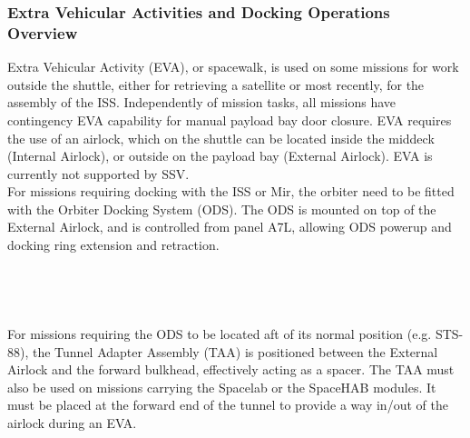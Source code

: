 \documentclass[Space_Shuttle_Vessel_Manual.tex]{subfiles}
\begin{document}
\begin{multicols*}{2}
\subsubsection{Extra Vehicular Activities and Docking Operations Overview}
Extra Vehicular Activity (EVA), or spacewalk, is used on some missions for work outside the shuttle, either for retrieving a satellite or most recently, for the assembly of the ISS. Independently of mission tasks, all missions have contingency EVA capability for manual payload bay door closure. EVA requires the use of an airlock, which on the shuttle can be located inside the middeck (Internal Airlock), or outside on the payload bay (External Airlock). EVA is currently not supported by SSV.\\
For missions requiring docking with the ISS or Mir, the orbiter need to be fitted with the Orbiter Docking System (ODS). The ODS is mounted on top of the External Airlock, and is controlled from panel A7L, allowing ODS powerup and docking ring extension and retraction.\\
\\
\\
\\
\\
For missions requiring the ODS to be located aft of its normal position (e.g. STS-88), the Tunnel Adapter Assembly (TAA) is positioned between the External Airlock and the forward bulkhead, effectively acting as a spacer. The TAA must also be used on missions carrying the Spacelab or the SpaceHAB modules. It must be placed at the forward end of the tunnel to provide a way in/out of the airlock during an EVA.



\end{multicols*}
\end{document}
